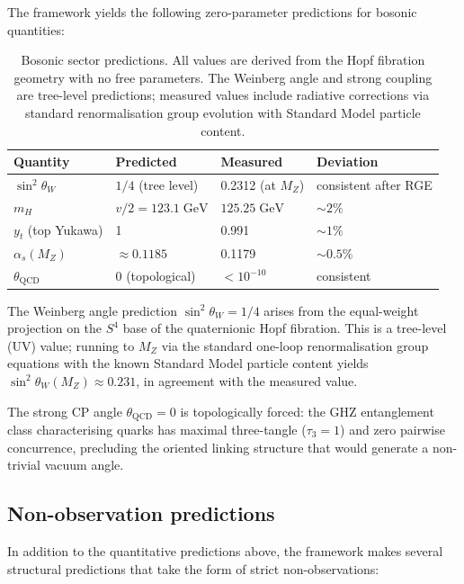 \documentclass{article}
\begin{document}
The framework yields the following zero-parameter predictions for bosonic quantities:

\begin{table}[h]
  \centering
  \caption{Bosonic sector predictions. All values are derived from the Hopf fibration geometry with no free parameters. The Weinberg angle and strong coupling are tree-level predictions; measured values include radiative corrections via standard renormalisation group evolution with Standard Model particle content.}
  \label{tab:bosons}
  \begin{tabular}{llll}
    \toprule
    Quantity & Predicted & Measured & Deviation \\
    \midrule
    $\sin^2\!\theta_W$ & $1/4$ (tree level) & 0.2312 (at $M_Z$) & consistent after RGE \\
    $m_H$ & $v/2 = 123.1\;\mathrm{GeV}$ & $125.25\;\mathrm{GeV}$ & $\sim 2\%$ \\
    $y_t$ (top Yukawa) & 1 & 0.991 & $\sim 1\%$ \\
    $\alpha_s(M_Z)$ & $\approx 0.1185$ & 0.1179 & $\sim 0.5\%$ \\
    $\theta_{\mathrm{QCD}}$ & 0 (topological) & $< 10^{-10}$ & consistent \\
    \bottomrule
  \end{tabular}
\end{table}

The Weinberg angle prediction $\sin^2\!\theta_W = 1/4$ arises from the equal-weight projection on the $S^4$ base of the quaternionic Hopf fibration. This is a tree-level (UV) value; running to $M_Z$ via the standard one-loop renormalisation group equations with the known Standard Model particle content yields $\sin^2\!\theta_W(M_Z) \approx 0.231$, in agreement with the measured value.

The strong CP angle $\theta_{\mathrm{QCD}} = 0$ is topologically forced: the GHZ entanglement class characterising quarks has maximal three-tangle ($\tau_3 = 1$) and zero pairwise concurrence, precluding the oriented linking structure that would generate a non-trivial vacuum angle.

\subsection{Non-observation predictions}

In addition to the quantitative predictions above, the framework makes several structural predictions that take the form of strict non-observations:
\end{document}
